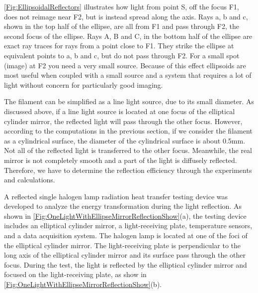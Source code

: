 \ref{Fig:EllipsoidalReflectors} illustrates how light from point S, off the focus F1, does not reimage near F2, but is instead spread along the axis.
Rays a, b and c, shown in the top half of the ellipse, are all from F1 and pass through F2, the second focus of the ellipse. Rays A, B and C, in the bottom half of the ellipse are exact ray traces for rays from a point close to F1. They strike the ellipse at equivalent points to a, b and c, but do not pass through F2. For a small spot (image) at F2 you need a very small source.
Because of this effect ellipsoids are most useful when coupled with a small source and a system that requires a lot of light without concern for particularly good imaging.



The filament can be simplified as a line light source, due to its small diameter. As discussed above, if a line light source is located at one focus of the elliptical cylinder mirror, the reflected light will pass through the other focus.
However, according to the computations in the previous section, if we consider the filament as a cylindrical surface, the diameter of the cylindrical surface is about 0.5mm. Not all of the reflected light is transferred to the other focus.
Meanwhile, the real mirror is not completely smooth and a part of the light is diffusely reflected. Therefore, we have to determine the reflection efficiency through the experiments and calculations.

A reflected single halogen lamp radiation heat transfer testing device was developed to analyze the energy transformation during the light reflection.
As shown in \ref{Fig:OneLightWithEllipseMirrorReflectionShow}(a), the testing
device includes an elliptical cylinder mirror, a light-receiving plate, temperature sensors, and a data acquisition system.
The halogen lamp is located at one of the foci of the elliptical cylinder mirror. The light-receiving plate is perpendicular to the long axis of the elliptical cylinder mirror and its surface pass through the other focus. During the test, the light is reflected by the elliptical cylinder mirror and focused on the light-receiving plate, as show in \ref{Fig:OneLightWithEllipseMirrorReflectionShow}(b).

